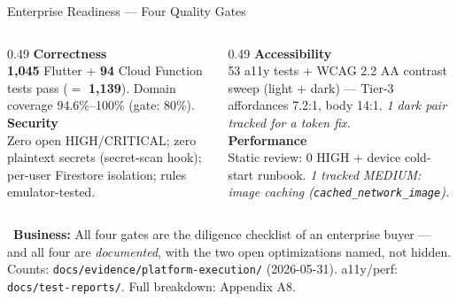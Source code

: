 \documentclass[aspectratio=169,11pt]{beamer}
\providecommand{\faChartPie}{}
\newcommand{\biz}[1]{\vspace{0.3em}\par{\footnotesize\color{moodorange}\faChartPie\ \textbf{Business:} #1}}
\begin{document}
\begin{frame}{Enterprise Readiness --- Four Quality Gates}
\begin{columns}[T,onlytextwidth]
  \begin{column}{0.49\textwidth}
    \textbf{\color{moodgreen}Correctness}\\
    {\footnotesize \textbf{1,045} Flutter + \textbf{94} Cloud Function tests pass ($=$ \textbf{1,139}). Domain coverage 94.6\%--100\% (gate: 80\%).}\\[0.4em]
    \textbf{\color{moodgreen}Security}\\
    {\footnotesize Zero open HIGH/CRITICAL; zero plaintext secrets (secret-scan hook); per-user Firestore isolation; rules emulator-tested.}
  \end{column}
  \begin{column}{0.49\textwidth}
    \textbf{\color{moodgreen}Accessibility}\\
    {\footnotesize 53 a11y tests + WCAG 2.2 AA contrast sweep (light + dark) --- Tier-3 affordances 7.2:1, body 14:1. \emph{1 dark pair tracked for a token fix.}}\\[0.4em]
    \textbf{\color{moodgreen}Performance}\\
    {\footnotesize Static review: 0 HIGH + device cold-start runbook. \emph{1 tracked MEDIUM: image caching (\texttt{cached\_network\_image}).}}
  \end{column}
\end{columns}
\biz{All four gates are the diligence checklist of an enterprise buyer --- and all four are \emph{documented}, with the two open optimizations named, not hidden.}
{\footnotesize\color{gray!70} Counts: \texttt{docs/evidence/platform-execution/} (2026-05-31). a11y/perf: \texttt{docs/test-reports/}. Full breakdown: Appendix A8.}
\end{frame}
\end{document}
